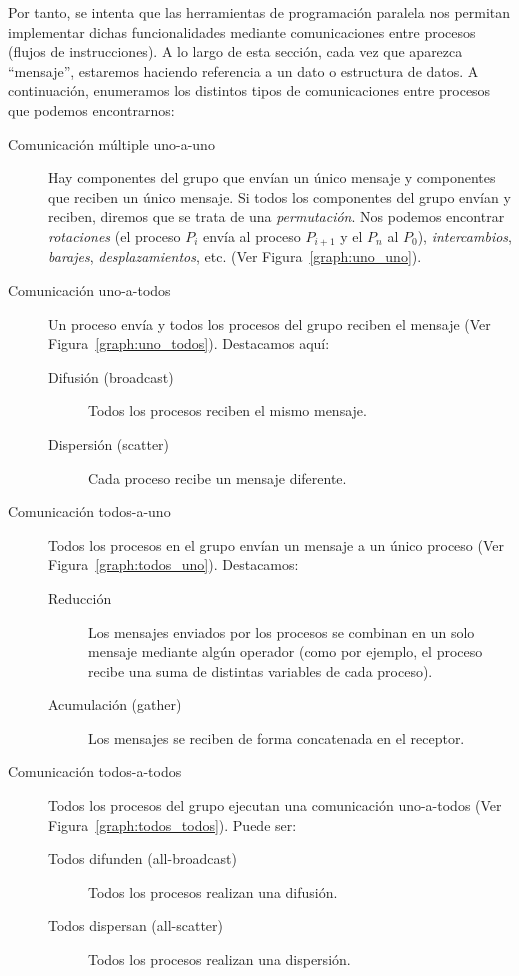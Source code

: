Por tanto, se intenta que las herramientas de programación paralela nos permitan implementar dichas funcionalidades mediante comunicaciones entre procesos (flujos de instrucciones). A lo largo de esta sección, cada vez que aparezca ``mensaje'', estaremos haciendo referencia a un dato o estructura de datos. A continuación, enumeramos los distintos tipos de comunicaciones entre procesos que podemos encontrarnos:
\begin{description} 
    \item [Comunicación múltiple uno-a-uno] Hay componentes del grupo que envían un único mensaje y componentes que reciben un único mensaje. Si todos los componentes del grupo envían y reciben, diremos que se trata de una \emph{permutación}. Nos podemos encontrar \emph{rotaciones} (el proceso $P_i$ envía al proceso $P_{i+1}$ y el $P_n$ al $P_0$), \emph{intercambios}, \emph{barajes}, \emph{desplazamientos}, etc. (Ver Figura~\ref{graph:uno_uno}).

    \item [Comunicación uno-a-todos] Un proceso envía y todos los procesos del grupo reciben el mensaje (Ver Figura~\ref{graph:uno_todos}). Destacamos aquí:
        \begin{description}
            \item [Difusión (broadcast)] Todos los procesos reciben el mismo mensaje.
            \item [Dispersión (scatter)] Cada proceso recibe un mensaje diferente.
        \end{description}

    \item [Comunicación todos-a-uno] Todos los procesos en el grupo envían un mensaje a un único proceso (Ver Figura~\ref{graph:todos_uno}). Destacamos:
        \begin{description}
            \item [Reducción] Los mensajes enviados por los procesos se combinan en un solo mensaje mediante algún operador (como por ejemplo, el proceso recibe una suma de distintas variables de cada proceso).
            \item [Acumulación (gather)] Los mensajes se reciben de forma concatenada en el receptor.
        \end{description}

    \item [Comunicación todos-a-todos] Todos los procesos del grupo ejecutan una comunicación uno-a-todos (Ver Figura~\ref{graph:todos_todos}). Puede ser:
        \begin{description}
            \item [Todos difunden (all-broadcast)] Todos los procesos realizan una difusión.
            \item [Todos dispersan (all-scatter)] Todos los procesos realizan una dispersión.
        \end{description}


\end{description}
